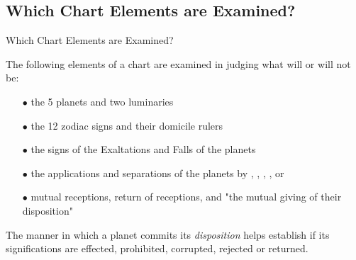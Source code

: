 \subsection{Which Chart Elements are Examined?}
\begin{frame}[t]{Which Chart Elements are Examined?}

The following elements of a chart are examined in judging what will or will not be:
\begin{itemize}
\item[$\bullet$] the 5 planets and two luminaries
\item[$\bullet$] the 12 zodiac signs and their domicile rulers
\item[$\bullet$] the signs of  the Exaltations and Falls of the planets
\item[$\bullet$] the applications and separations of the planets by \Conjunction, \Sextile, \Square, \Trine, or \Opposition\ 
\item[$\bullet$] mutual receptions, return of receptions, and "the mutual giving of their disposition"
\end{itemize}
\vspace{0.5cm}

The manner in which a planet commits its \textsl{disposition} helps establish if its significations are effected, prohibited, corrupted, rejected or returned.
\end{frame}
